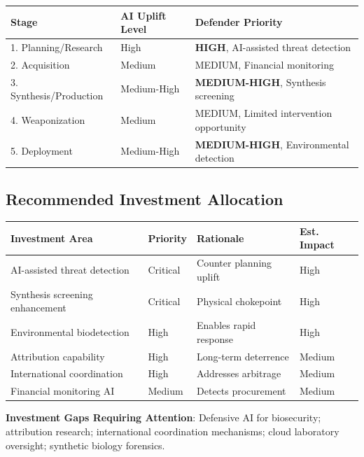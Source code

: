 \documentclass[11pt,letterpaper]{article}
\begin{document}
\vspace{0.4em}

\begin{center}
\small
\begin{tabular}{L{4cm}L{3cm}L{5cm}}
\toprule
\textbf{Stage} & \textbf{AI Uplift Level} & \textbf{Defender Priority} \\
. Planning/Research & High & \textbf{HIGH}, AI-assisted threat detection \\
2. Acquisition & Medium & MEDIUM, Financial monitoring \\
3. Synthesis/Production & Medium-High & \textbf{MEDIUM-HIGH}, Synthesis screening \\
4. Weaponization & Medium & MEDIUM, Limited intervention opportunity \\
5. Deployment & Medium-High & \textbf{MEDIUM-HIGH}, Environmental detection \\
\bottomrule
\end{tabular}
\end{center}

\subsection*{Recommended Investment Allocation}

\begin{center}
\small
\begin{tabular}{L{4cm}L{1.5cm}L{3.5cm}L{3cm}}
\toprule
\textbf{Investment Area} & \textbf{Priority} & \textbf{Rationale} & \textbf{Est. Impact} \\
\midrule
AI-assisted threat detection & Critical & Counter planning uplift & High \\
Synthesis screening enhancement & Critical & Physical chokepoint & High \\
Environmental biodetection & High & Enables rapid response & High \\
Attribution capability & High & Long-term deterrence & Medium \\
International coordination & High & Addresses arbitrage & Medium \\
Financial monitoring AI & Medium & Detects procurement & Medium \\
\bottomrule
\end{tabular}
\end{center}

\textbf{Investment Gaps Requiring Attention}: Defensive AI for biosecurity; attribution research; international coordination mechanisms; cloud laboratory oversight; synthetic biology forensics.
\end{document}
